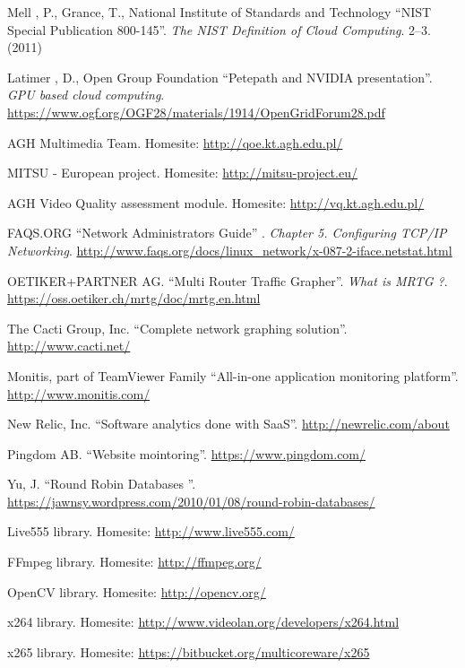 \documentclass[english,final]{setup/eetac_tfc_pfc}
\begin{document}
\begin{thebibliography}{2}
Mell , P., Grance, T., National Institute of Standards and Technology
``NIST Special Publication 800-145''. {\it The NIST Definition of Cloud Computing}.
2--3. (2011) 

Latimer , D., Open Group Foundation
``Petepath and NVIDIA presentation''. {\it GPU based cloud computing}.
\url{https://www.ogf.org/OGF28/materials/1914/OpenGridForum28.pdf}

AGH Multimedia Team. Homesite: \url{http://qoe.kt.agh.edu.pl/}

MITSU - European project. Homesite: \url{http://mitsu-project.eu/}

AGH Video Quality assessment module. Homesite: \url{http://vq.kt.agh.edu.pl/}

FAQS.ORG 
``Network Administrators Guide'' . {\it Chapter 5. Configuring TCP/IP Networking}.
\url{http://www.faqs.org/docs/linux_network/x-087-2-iface.netstat.html}

OETIKER+PARTNER AG.
``Multi Router Traffic Grapher''. {\it What is MRTG ?}.
\url{https://oss.oetiker.ch/mrtg/doc/mrtg.en.html}

The Cacti Group, Inc.
``Complete network graphing solution''. \url{http://www.cacti.net/}

Monitis, part of TeamViewer Family
``All-in-one application monitoring platform''. \url{http://www.monitis.com/}

 New Relic, Inc.
 ``Software analytics done with SaaS''. \url{http://newrelic.com/about}

 Pingdom AB.
 ``Website mointoring''. \url{https://www.pingdom.com/}

Yu, J.
 ``Round Robin Databases ''. \url{https://jawnsy.wordpress.com/2010/01/08/round-robin-databases/}

Live555 library. Homesite: \url{http://www.live555.com/}

FFmpeg library. Homesite: \url{http://ffmpeg.org/}

OpenCV library. Homesite: \url{http://opencv.org/}

x264 library. Homesite: \url{http://www.videolan.org/developers/x264.html}

x265 library. Homesite: \url{https://bitbucket.org/multicoreware/x265}


\end{thebibliography}
\end{document}
